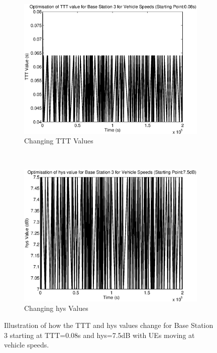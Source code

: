 \begin{figure}[H]
        \centering
        \begin{subfigure}[b]{0.49\textwidth}
                \includegraphics[width=\textwidth]{figures/graphs/vehhighhys/TTT3.eps}
                \caption{Changing TTT Values}
        \end{subfigure}%
        ~ %
        \begin{subfigure}[b]{0.49\textwidth}
                \includegraphics[width=\textwidth]{figures/graphs/vehhighhys/hys3.eps}
                \caption{Changing hys Values}
        \end{subfigure}
        \caption{Illustration of how the TTT and hys values change for Base Station 3 starting at TTT=0.08s and hys=7.5dB with UEs moving at vehicle speeds.}
\end{figure}
